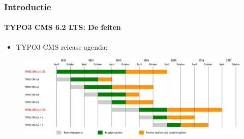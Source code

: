 
\begin{frame}[fragile]
	\frametitle{Introductie}
	\framesubtitle{TYPO3 CMS 6.2 LTS: De feiten}

	\begin{itemize}
		\item TYPO3 CMS release agenda:
	\end{itemize}

	\begin{figure}
		\includegraphics[width=0.99\linewidth]{Images/Introduction/ReleaseAgenda.png}
	\end{figure}

\end{frame}


